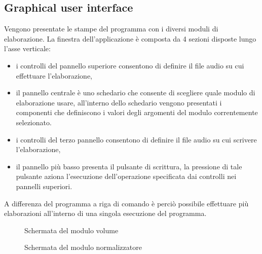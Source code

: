 \documentclass[a4papper]{article}
\begin{document}
\subsection{Graphical user interface}
Vengono presentate le stampe del programma con i diversi moduli di
elaborazione. La finestra dell'applicazione \`e composta da 4 sezioni
disposte lungo l'asse verticale: 
\begin{itemize}
\item i controlli del pannello superiore consentono di definire il
  file audio su cui effettuare l'elaborazione,
\item il pannello centrale \`e uno schedario che consente di scegliere
  quale modulo di elaborazione usare, all'interno dello schedario
  vengono presentati i componenti che definiscono i valori degli
  argomenti del modulo correntemente selezionato.
\item i controlli del terzo pannello consentono di definire il
  file audio su cui scrivere l'elaborazione,
\item il pannello pi\`u basso presenta il pulsante di scrittura, la
  pressione di tale pulsante aziona l'esecuzione dell'operazione
  specificata dai controlli nei pannelli superiori.
\end{itemize}
A differenza del programma a riga di comando \`e perci\`o possibile
effettuare pi\`u elaborazioni all'interno di una singola esecuzione del
programma.
\begin{figure}[!h]
  \centering
  \caption{Schermata del modulo volume}
  \label{}
\end{figure}

\begin{figure}[!h]
  \centering
  \caption{Schermata del modulo normalizzatore}
  \label{}
\end{figure}
\end{document}
